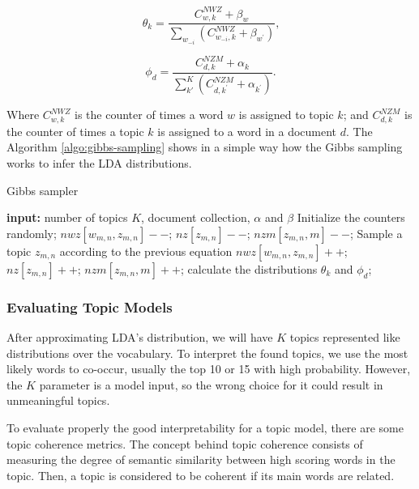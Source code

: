 	\begin{equation}
		\label{eq:theta-dist}
		\theta_{k} = \frac{C_{w,k}^{NWZ} + \beta_{w}} {\sum_{w_{-i}} \left(C_{w_{-i},k}^{NWZ} + \beta_{w^{'}} \right)} \text{,}
	\end{equation}
	
	\begin{equation}
		\label{eq:phi-dist}
		\phi_{d} = \frac{C_{d,k}^{NZM} + \alpha_{k}} {\sum_{k'}^{K} \left(C_{d,k^{'}}^{NZM} + \alpha_{k^{'}} \right)} \text{.}
	\end{equation}

	Where $C_{w,k}^{NWZ}$ is the counter of times a word $w$ is assigned to topic $k$; and $C_{d,k}^{NZM}$ is the counter of times a topic $k$ is assigned to a word in a document $d$. The Algorithm \ref{algo:gibbs-sampling} shows in a simple way how the Gibbs sampling works to infer the LDA distributions.
	
	\begin{algorithm}[h!]
		\caption{Gibbs sampler} 
		\label{algo:gibbs-sampling}
		\begin{algorithmic}[1]
			\State \textbf{input:} number of topics $K$, document collection, $\alpha$ and $\beta$
			\Begin
			\State Initialize the counters randomly;
			\State $nwz[w_{m,n}, z_{m,n}]--$; $nz[z_{m,n}]--$; $nzm[z_{m,n},m]--$;
			\State Sample a topic $z_{m,n}$ according to the previous equation
			\State $nwz[w_{m,n}, z_{m,n}]++$; $nz[z_{m,n}]++$; $nzm[z_{m,n},m]++$;
			\EndFor
			\EndFor
			\State calculate the distributions $\theta_{k}$ and $\phi_{d}$;
			\EndIf
			\EndWhile
			\End
		\end{algorithmic} 
	\end{algorithm}
	
	\subsubsection{Evaluating Topic Models}
	
	After approximating LDA's distribution, we will have $K$ topics represented like distributions over the vocabulary. To interpret the found topics, we use the most likely words to co-occur, usually the top 10 or 15 with high probability. However, the $K$ parameter is a model input, so the wrong choice for it could result in unmeaningful topics. 
	
	To evaluate properly the good interpretability for a topic model, there are some topic coherence metrics. The concept behind topic coherence consists of measuring the degree of semantic similarity between high scoring words in the topic. Then, a topic is considered to be coherent if its main words are related.
	
